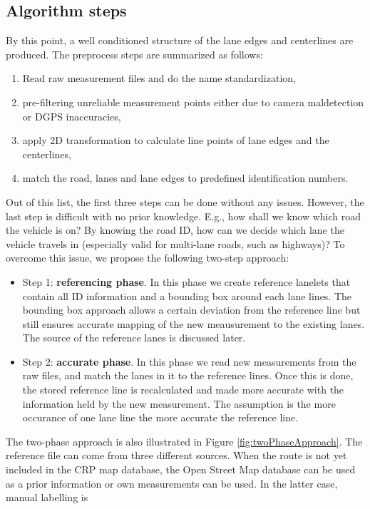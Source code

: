 \documentclass[sn-mathphys-num]{sn-jnl}%
\begin{document}
\subsection{Algorithm steps}
By this point, a well conditioned structure of the lane edges and centerlines are produced. The preprocess steps are summarized as follows:
\begin{enumerate}
    \item Read raw measurement files and do the name standardization,
    \item pre-filtering unreliable measurement points either due to camera maldetection or DGPS inaccuracies,
    \item apply 2D transformation to calculate line points of lane edges and the centerlines,
    \item match the road, lanes and lane edges to predefined identification numbers.
\end{enumerate}
Out of this list, the first three steps can be done without any issues. However, the last step is difficult with no prior knowledge. E.g., how shall we know which road 
the vehicle is on? By knowing the road ID, how can we decide which lane the vehicle travels in (especially valid for multi-lane roads, such as highways)?
To overcome this issue, we propose the following two-step approach:
\begin{itemize}
    \item Step 1: \textbf{referencing phase}. In this phase we create reference lanelets that contain all ID information and a bounding box around each lane lines. The bounding box approach allows a certain deviation from the reference line but still ensures accurate mapping of the new meausurement to the existing lanes. The source of the reference lanes is discussed later.
    \item Step 2: \textbf{accurate phase}. In this phase we read new measurements from the raw files, and match the lanes in it to the reference lines. Once this is done, the stored reference line is recalculated and made more accurate with the information held by the new measurement. The assumption is the more occurance of one lane line the more accurate the reference line.
\end{itemize}
The two-phase approach is also illustrated in Figure \ref{fig:twoPhaseApproach}. The reference file can come from three different sources. When the route is not yet 
included in the CRP map database, the Open Street Map database can be used as a prior information or own measurements can be used. In the latter case, manual labelling is 
\end{document}
